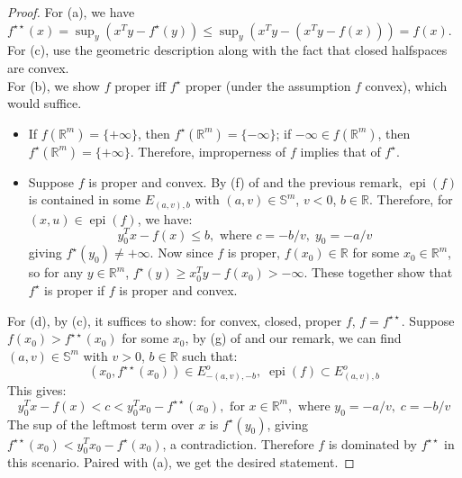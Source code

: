 \begin{proof}
	For (a), we have $f^{\star\star}(x)=\sup_y\left(x^Ty-f^\star(y)\right)\leq \sup_y \left(x^Ty-\left(x^Ty-f(x)\right)\right)=f(x)$.\\
	For (c), use the geometric description along with the fact that closed halfspaces are convex.\\
	For (b), we show $f$ proper iff $f^\star$ proper (under the assumption $f$ convex), which would suffice.
	\begin{itemize}
		\item If $f(\mathbb{R}^m)=\{+\infty\}$, then $f^\star(\mathbb{R}^m)=\{-\infty\}$; if $-\infty\in f(\mathbb{R}^m)$, then $f^\star(\mathbb{R}^m)=\{+\infty\}$. Therefore, improperness of $f$ implies that of $f^\star$.
		\item Suppose $f$ is proper and convex. By (f) of  and the previous remark, $\operatorname{epi}(f)$ is contained in some $E_{(a,v),b}$ with $(a,v)\in \mathbb{S}^{m}$, $v<0$, $b\in \mathbb{R}$. Therefore, for $(x,u)\in \operatorname{epi}(f)$, we have:
		      \[
			      y_0^Tx-f(x)\leq b,\text{ where }c=-b/v,\;y_0=-a/v
		      \]
		      giving $f^\star(y_0)\neq+\infty$. Now since $f$ is proper, $f(x_0)\in \mathbb{R}$ for some $x_0\in \mathbb{R}^m$, so for any $y\in \mathbb{R}^m$, $f^\star(y)\geq x_0^Ty-f(x_0)>-\infty$. These together show that $f^\star$ is proper if $f$ is proper and convex.
	\end{itemize}
	For (d), by (c), it suffices to show: for convex, closed, proper $f$, $f=f^{\star\star}$. Suppose $f(x_0)>f^{\star\star}(x_0)$ for some $x_0$, by (g) of  and our remark, we can find $(a,v)\in \mathbb{S}^m$ with $v>0$, $b\in \mathbb{R}$ such that:
	\[
		\left(x_0,f^{\star\star}(x_0)\right)\in E^{o}_{-(a,v),-b}, \; \operatorname{epi}(f)\subset E^o_{(a,v),b}
	\]
	This gives:
	\[
		y_0^Tx-f(x)<c<y_0^Tx_0-f^{\star\star}(x_0),\text{ for }x\in \mathbb{R}^m,\text{ where }y_0=-a/v,\; c=-b/v
	\]
	The sup of the leftmost term over $x$ is $f^\star(y_0)$, giving $f^{\star\star}(x_0)<y_0^Tx_0-f^\star(x_0)$, a contradiction. Therefore $f$ is dominated by $f^{\star\star}$ in this scenario. Paired with (a), we get the desired statement.
\end{proof}


